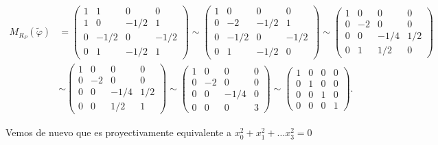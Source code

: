 {\[
\begin{aligned}
M_{R_P}(\tilde{\varphi}) &= 
\begin{pmatrix}
1 & 1 & 0 & 0 \\
1 & 0 & -1/2 & 1 \\
0 & -1/2 & 0 & -1/2 \\
0 & 1 & -1/2 & 1
\end{pmatrix}
\sim
\begin{pmatrix}
1 & 0 & 0 & 0 \\
0 & -2 & -1/2 & 1 \\
0 & -1/2 & 0 & -1/2 \\
0 & 1 & -1/2 & 0
\end{pmatrix}
\sim
\begin{pmatrix}
1 & 0 & 0 & 0 \\
0 & -2 & 0 & 0 \\
0 & 0 & -1/4 & 1/2 \\
0 & 1 & 1/2 & 0
\end{pmatrix} \\
&\sim
\begin{pmatrix}
1 & 0 & 0 & 0 \\
0 & -2 & 0 & 0 \\
0 & 0 & -1/4 & 1/2 \\
0 & 0 & 1/2 & 1
\end{pmatrix}
\sim
\begin{pmatrix}
1 & 0 & 0 & 0 \\
0 & -2 & 0 & 0 \\
0 & 0 & -1/4 & 0 \\
0 & 0 & 0 & 3
\end{pmatrix}
\sim
\begin{pmatrix}
1 & 0 & 0 & 0 \\
0 & 1 & 0 & 0 \\
0 & 0 & 1 & 0 \\
0 & 0 & 0 & 1
\end{pmatrix}.
\end{aligned}
\]

Vemos de nuevo que es proyectivamente equivalente a $x_0^2 + x_1^2 + \dots x_3^2 = 0$
    

}


